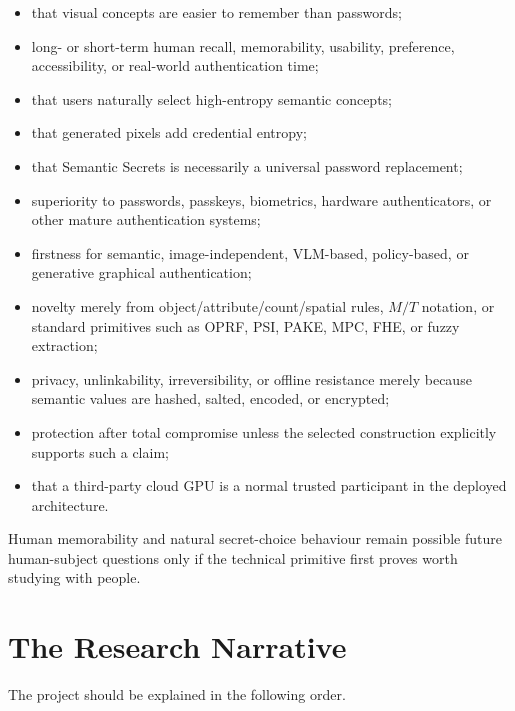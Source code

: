 \documentclass[11pt,a4paper]{article}
\begin{document}
\begin{itemize}
  \item that visual concepts are easier to remember than passwords;
  \item long- or short-term human recall, memorability, usability, preference, accessibility, or real-world authentication time;
  \item that users naturally select high-entropy semantic concepts;
  \item that generated pixels add credential entropy;
  \item that Semantic Secrets is necessarily a universal password replacement;
  \item superiority to passwords, passkeys, biometrics, hardware authenticators, or other mature authentication systems;
  \item firstness for semantic, image-independent, VLM-based, policy-based, or generative graphical authentication;
  \item novelty merely from object/attribute/count/spatial rules, $M/T$ notation, or standard primitives such as OPRF, PSI, PAKE, MPC, FHE, or fuzzy extraction;
  \item privacy, unlinkability, irreversibility, or offline resistance merely because semantic values are hashed, salted, encoded, or encrypted;
  \item protection after total compromise unless the selected construction explicitly supports such a claim;
  \item that a third-party cloud GPU is a normal trusted participant in the deployed architecture.
\end{itemize}

Human memorability and natural secret-choice behaviour remain possible future human-subject questions only if the technical primitive first proves worth studying with people.

\section{The Research Narrative}

The project should be explained in the following order.
\end{document}
